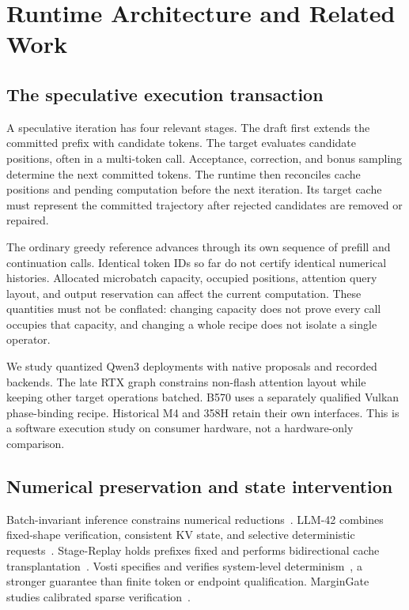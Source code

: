 \section{Runtime Architecture and Related Work}
\label{sec:background}
\subsection{The speculative execution transaction}
A speculative iteration has four relevant stages. The draft first extends the committed prefix with candidate tokens. The target evaluates candidate positions, often in a multi-token call. Acceptance, correction, and bonus sampling determine the next committed tokens. The runtime then reconciles cache positions and pending computation before the next iteration. Its target cache must represent the committed trajectory after rejected candidates are removed or repaired.

The ordinary greedy reference advances through its own sequence of prefill and continuation calls. Identical token IDs so far do not certify identical numerical histories. Allocated microbatch capacity, occupied positions, attention query layout, and output reservation can affect the current computation. These quantities must not be conflated: changing capacity does not prove every call occupies that capacity, and changing a whole recipe does not isolate a single operator.

We study quantized Qwen3 deployments with native proposals and recorded backends. The late RTX graph constrains non-flash attention layout while keeping other target operations batched. B570 uses a separately qualified Vulkan phase-binding recipe. Historical M4 and 358H retain their own interfaces. This is a software execution study on consumer hardware, not a hardware-only comparison.

\subsection{Numerical preservation and state intervention}
Batch-invariant inference constrains numerical reductions~\cite{thinkingmachines}. LLM-42 combines fixed-shape verification, consistent KV state, and selective deterministic requests~\cite{llm42}. Stage-Replay holds prefixes fixed and performs bidirectional cache transplantation~\cite{stagereplay}. Vosti specifies and verifies system-level determinism~\cite{vosti}, a stronger guarantee than finite token or endpoint qualification. MarginGate studies calibrated sparse verification~\cite{margingate}.

